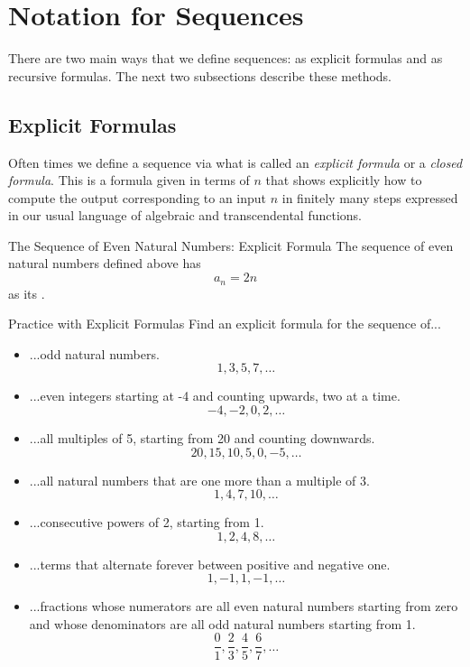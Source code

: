 \section{Notation for Sequences}

There are two main ways that we define sequences: as explicit formulas and as recursive formulas. The next two subsections describe these methods.

\subsection{Explicit Formulas}\label{exp}

Often times we define a sequence via what is called an \emph{explicit formula} or a \emph{closed formula}.  This is a formula given in terms of $n$ that shows explicitly how to compute the output corresponding to an input $n$ in finitely many steps expressed in our usual language of algebraic and transcendental functions.
\begin{example}{The Sequence of Even Natural Numbers: Explicit Formula}
The sequence of even natural numbers defined above has $$a_n=2n $$ as its .
\end{example}

\begin{exercise}{Practice with Explicit Formulas \Coffeecup \Coffeecup}\label{expForms}
Find an explicit formula for the sequence of...
\begin{itemize}
\item ...odd natural numbers. $$1,3,5,7,\ldots$$
\item ...even integers starting at -4 and counting upwards, two at a time. $$-4,-2,0,2,\ldots$$
\item ...all multiples of 5, starting from 20 and counting downwards. $$20,15,10,5,0,-5,\ldots$$
\item ...all natural numbers that are one more than a multiple of 3. $$1,4,7,10,\ldots$$
\item ...consecutive powers of 2, starting from 1. $$1,2,4,8,\ldots$$
\item ...terms that alternate forever between positive and negative one. $$1,-1,1,-1,\ldots$$
\item ...fractions whose numerators are all even natural numbers starting from zero and whose denominators are all odd natural numbers starting from 1. $$\frac{0}{1},\frac{2}{3},\frac{4}{5},\frac{6}{7},\ldots$$
\end{itemize}

\end{exercise}

